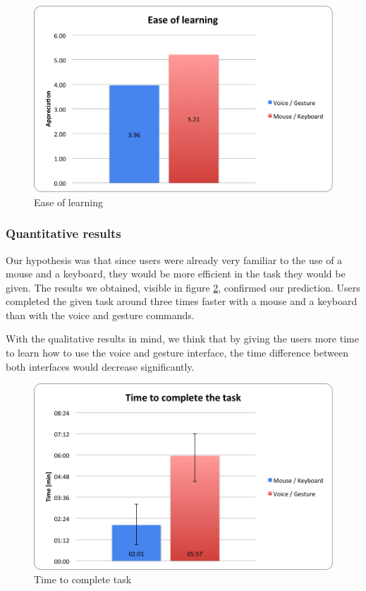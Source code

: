 \documentclass[a4paper, 10pt]{article}
\begin{document}
	\begin{figure}[h]
		\centering
			\includegraphics[scale=0.7]{graphs/ease_of_learning.png}
		\caption{Ease of learning}
		\label{fig:easeoflearning}
	\end{figure}
	
	\subsubsection{Quantitative results}	
	
	\par{Our hypothesis was that since users were already very familiar to the use of a mouse and a keyboard, they would be more efficient in the task they would be given. The results we obtained, visible in figure \ref{fig:completetask}, confirmed our prediction. Users completed the given task around three times faster with a mouse and a keyboard than with the voice and gesture commands.}
	\par{With the qualitative results in mind, we think that by giving the users more time to learn how to use the voice and gesture interface, the time difference between both interfaces would decrease significantly.}
	
	\begin{figure}[h]
		\centering
			\includegraphics[scale=0.7]{graphs/time_to_complete_task.png}
		\caption{Time to complete task}
		\label{fig:completetask}
	\end{figure}
	
\end{document}
